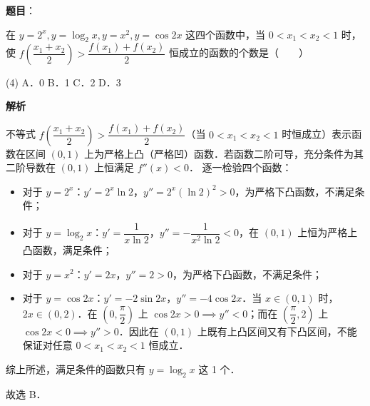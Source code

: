 \begin{answer}

\textbf{题目}：

在 $y = 2^x, y = \log_2 x, y = x^2, y = \cos 2x$ 这四个函数中，当 $0 < x_1 < x_2 < 1$ 时，使 $f\left(\dfrac{x_1 + x_2}{2}\right) > \dfrac{f(x_1) + f(x_2)}{2}$ 恒成立的函数的个数是\mbox{（　　）}

\begin{gkopts}(4)
\task A．0
\task B．1
\task C．2
\task D．3
\end{gkopts}

\textbf{解析}

不等式 $f\left(\dfrac{x_1 + x_2}{2}\right) > \dfrac{f(x_1) + f(x_2)}{2}$（当 $0 < x_1 < x_2 < 1$ 时恒成立）表示函数在区间 $(0, 1)$ 上为严格上凸（严格凹）函数．若函数二阶可导，充分条件为其二阶导数在 $(0, 1)$ 上恒满足 $f''(x) < 0$．
逐一检验四个函数：
\begin{itemize}
\item 对于 $y = 2^x$：$y' = 2^x \ln 2$，$y'' = 2^x (\ln 2)^2 > 0$，为严格下凸函数，不满足条件；
\item 对于 $y = \log_2 x$：$y' = \dfrac{1}{x\ln 2}$，$y'' = -\dfrac{1}{x^2\ln 2} < 0$，在 $(0, 1)$ 上恒为严格上凸函数，满足条件；
\item 对于 $y = x^2$：$y' = 2x$，$y'' = 2 > 0$，为严格下凸函数，不满足条件；
\item 对于 $y = \cos 2x$：$y' = -2\sin 2x$，$y'' = -4\cos 2x$．当 $x \in (0, 1)$ 时，$2x \in (0, 2)$．在 $\left(0, \dfrac{\pi}{2}\right)$ 上 $\cos 2x > 0 \implies y'' < 0$；而在 $\left(\dfrac{\pi}{2}, 2\right)$ 上 $\cos 2x < 0 \implies y'' > 0$．因此在 $(0, 1)$ 上既有上凸区间又有下凸区间，不能保证对任意 $0 < x_1 < x_2 < 1$ 恒成立．
\end{itemize}

综上所述，满足条件的函数只有 $y = \log_2 x$ 这 1 个．

故选 B．


\end{answer}
